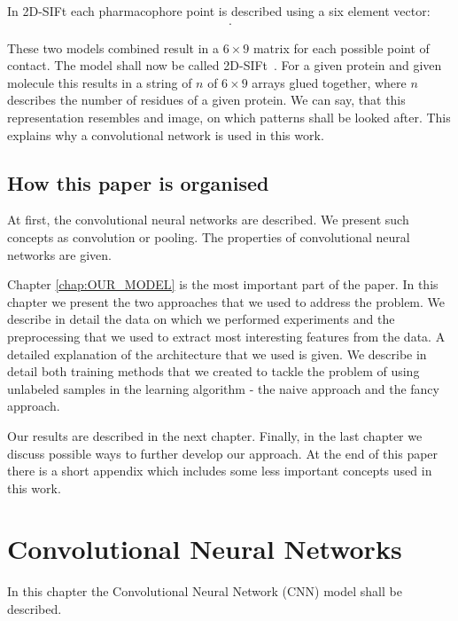 \documentclass[a4paper,10pt]{report}
\begin{document}
    In 2D-SIFt each pharmacophore point is described using a six element vector:
    \begin{align*}
    [\text{H-bond donor},&\text{H-bond acceptor},\text{hydrophobic}, \\
    &\text{negatively charged},\text{positively charged},\text{aromatic}].
    \end{align*}



    These two models combined result in a $6\times{}9$ matrix for each possible point of contact. The model shall now be called 2D-SIFt~\cite{Mordalski2011}. For a given protein and given molecule this results in a string of $n$ of $6\times{}9$ arrays glued together, where $n$ describes the number of residues of a given protein. We can say, that this representation resembles and image, on which patterns shall be looked after. This explains why a convolutional network is used in this work.
      
   
    \section{How this paper is organised}
    
    At first, the convolutional neural networks are described. We present such concepts as convolution or pooling. The properties of convolutional neural networks are given. 
    
    Chapter \ref{chap:OUR_MODEL} is the most important part of the paper. In this chapter we present the two approaches that we used to address the problem. We describe in detail the data on which we performed experiments and the preprocessing that we used to extract most interesting features from the data. A detailed explanation of the architecture that we used is given. We describe in detail both training methods that we created to tackle the problem of using unlabeled samples in the learning algorithm - the naive approach and the fancy approach. 
    
    Our results are described in the next chapter. Finally, in the last chapter we discuss possible ways to further develop our approach. At the end of this paper there is a short appendix which includes some less important concepts used in this work.
    

  \chapter{Convolutional Neural Networks}
  In this chapter the Convolutional Neural Network (CNN) model shall be described.
  
\end{document}
